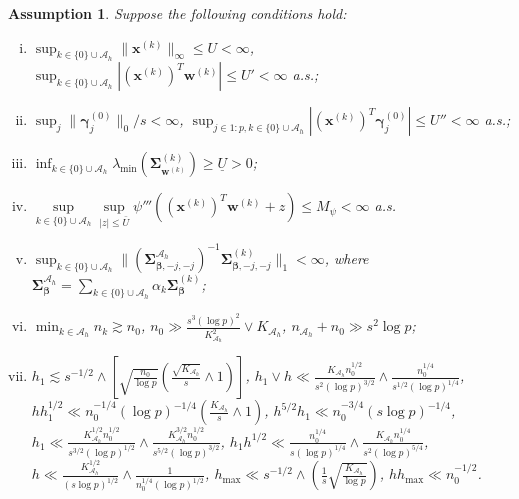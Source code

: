 \documentclass[12pt]{article}
\newcommand{\infnorm}[1]{\|#1\|_{\infty}}
\newcommand{\onenorm}[1]{\|#1\|_{1}}
\newcommand{\zeronorm}[1]{\|#1\|_{0}}
\newcommand{\norm}[1]{|#1|}
\newcommand{\bbeta}{\bm{\beta}}
\newcommand{\bgammak}[1]{\bm{\gamma}^{(#1)}}
\newcommand{\bxk}[1]{\bm{x}^{(#1)}}
\newcommand{\bwk}[1]{\bm{w}^{(#1)}}
\newcommand{\mah}{\mathcal{A}_h}
\newcommand{\nah}{n_{\mathcal{A}_h}}
\newcommand{\transet}{\{0\}\cup \mah}
\newcommand{\Kah}{K_{\mah}}
\newcommand{\<}{\langle}
\renewcommand{\>}{\rangle}
\newcommand{\bSigmak}[1]{\bm{\Sigma}^{(#1)}}
\newtheorem{assumption}{Assumption}
\begin{document}
\begin{assumption}\label{asmp: inf}
	Suppose the following conditions hold:
	\begin{enumerate}[(i)]
		\item $\sup_{k \in \transet}\infnorm{\bxk{k}} \leq U < \infty$, $\sup_{k \in \transet}\norm{(\bxk{k})^T\bwk{k}} \leq U' < \infty$ a.s.;
		\item $\sup_j\zeronorm{\bgammak{0}_j}/s < \infty$, $\sup_{j \in 1:p, k \in \transet} |(\bxk{k})^T\bgammak{0}_j| \leq U'' < \infty$ a.s.;
		\item $\inf_{k \in \transet}\lambda_{\min}(\bSigmak{k}_{\bwk{k}}) \geq \underline{U} > 0$;
		\item $\sup\limits_{k \in \transet}\sup\limits_{|z|\leq \bar{U}} \psi'''((\bxk{k})^T\bwk{k} + z) \leq M_{\psi}< \infty$ a.s.
		\item $\sup_{k \in \transet}\onenorm{(\bm{\Sigma}_{\bbeta,-j,-j}^{\mah})^{-1}\bm{\Sigma}^{(k)}_{\bbeta, -j, -j}} < \infty$, where $\bm{\Sigma}^{\mah}_{\bbeta} = \sum_{k \in \transet}\alpha_k \bm{\Sigma}^{(k)}_{\bbeta}$;
		\item $\min_{k \in \mah}n_k \gtrsim n_0$, $n_0 \gg \frac{s^3(\log p)^2}{\Kah^2} \vee \Kah$, $\nah+n_0 \gg s^2\log p$;
		\item $h_1 \lesssim s^{-1/2} \wedge \left[\sqrt{\frac{n_0}{\log p}}\left(\frac{\sqrt{\Kah}}{s} \wedge 1\right)\right]$, $h_1 \vee h \ll \frac{\Kah n_0^{1/2}}{s^2(\log p)^{3/2}} \wedge \frac{n_0^{1/4}}{s^{1/2}(\log p)^{1/4}}$, $hh_1^{1/2} \ll n_0^{-1/4}(\log p)^{-1/4}\left(\frac{\Kah}{s} \wedge 1\right)$, $h^{5/2}h_1 \ll n_0^{-3/4}(s\log p)^{-1/4}$, $h_1 \ll \frac{\Kah^{1/2}n_0^{1/2}}{s^{3/2}(\log p)^{1/2}} \wedge \frac{\Kah^{3/2}n_0^{1/2}}{s^{5/2}(\log p)^{3/2}}$, $h_1h^{1/2} \ll \frac{n_0^{1/4}}{s(\log p)^{1/4}} \wedge \frac{\Kah n_0^{1/4}}{s^2(\log p)^{5/4}}$, $h \ll \frac{\Kah^{1/2}}{(s\log p)^{1/2}} \wedge \frac{1}{n_0^{1/4}(\log p)^{1/2}}$, $h_{\max} \ll s^{-1/2} \wedge \left(\frac{1}{s}\sqrt{\frac{\Kah}{\log p}}\right)$, $hh_{\max} \ll n_0^{-1/2}$.
	\end{enumerate}
\end{assumption}
\end{document}
